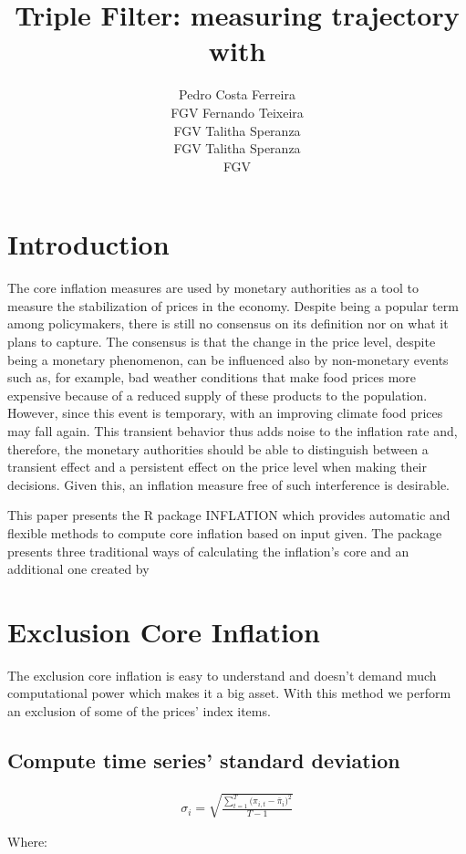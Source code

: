 \documentclass[article]{jss}
\author{
Pedro Costa Ferreira\\FGV \And Fernando Teixeira\\FGV \And Talitha Speranza\\FGV \And Talitha Speranza\\FGV
}
\title{Triple Filter: measuring trajectory with \pkg{INFLATION}}
\begin{document}
\section{Introduction}\label{introduction}

The core inflation measures are used by monetary authorities as a tool
to measure the stabilization of prices in the economy. Despite being a
popular term among policymakers, there is still no consensus on its
definition nor on what it plans to capture. The consensus is that the
change in the price level, despite being a monetary phenomenon, can be
influenced also by non-monetary events such as, for example, bad weather
conditions that make food prices more expensive because of a reduced
supply of these products to the population. However, since this event is
temporary, with an improving climate food prices may fall again. This
transient behavior thus adds noise to the inflation rate and, therefore,
the monetary authorities should be able to distinguish between a
transient effect and a persistent effect on the price level when making
their decisions. Given this, an inflation measure free of such
interference is desirable.

This paper presents the R \citep{rproj} package INFLATION \citep{inf}
which provides automatic and flexible methods to compute core inflation
based on input given. The package presents three traditional ways of
calculating the inflation's core and an additional one created by
\citep{triple}

\section{Exclusion Core Inflation}\label{exclusion-core-inflation}

The exclusion core inflation is easy to understand and doesn't demand
much computational power which makes it a big asset. With this method we
perform an exclusion of some of the prices' index items.

\subsection{Compute time series' standard
deviation}\label{compute-time-series-standard-deviation}

\begin{align}
\sigma_{i} = \sqrt{\frac{\sum\nolimits_{t=1}^{T}{(\pi_{i,t}-\bar{\pi}_{i}})^2}{T-1}}
\end{align}

Where:
\end{document}
